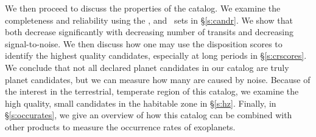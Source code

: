 We then proceed to discuss the properties of the catalog. We examine the completeness and reliability using the \injtce, \invtce and \scrtce\ sets in \S\ref{s:candr}. We show that both decrease significantly with decreasing number of transits and decreasing signal-to-noise.  We then discuss how one may use the disposition scores to identify the highest quality candidates, especially at long periods in \S\ref{s:crscores}.  We conclude that not all declared planet candidates in our catalog are truly planet candidates, but we can measure how many are caused by noise. Because of the interest in the terrestrial, temperate region of this catalog, we examine the high quality, small candidates in the habitable zone in \S\ref{s:hz}. Finally, in \S\ref{s:occurates}, we give an overview of how this catalog can be combined with other \Kepler{} products to measure the occurrence rates of exoplanets.








